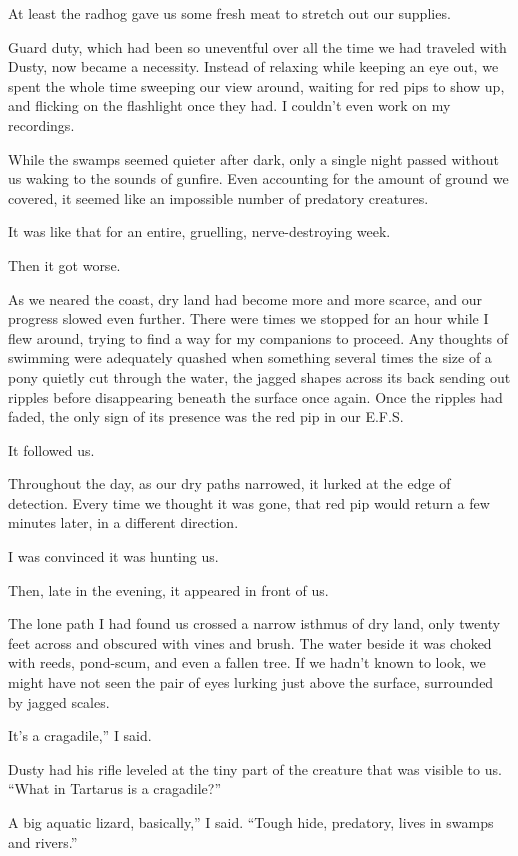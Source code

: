 At least the radhog gave us some fresh meat to stretch out our supplies.

Guard duty, which had been so uneventful over all the time we had traveled with Dusty, now became a necessity. Instead of relaxing while keeping an eye out, we spent the whole time sweeping our view around, waiting for red pips to show up, and flicking on the flashlight once they had. I couldn’t even work on my recordings.

While the swamps seemed quieter after dark, only a single night passed without us waking to the sounds of gunfire. Even accounting for the amount of ground we covered, it seemed like an impossible number of predatory creatures.

It was like that for an entire, gruelling, nerve-destroying week.

Then it got worse.

As we neared the coast, dry land had become more and more scarce, and our progress slowed even further. There were times we stopped for an hour while I flew around, trying to find a way for my companions to proceed. Any thoughts of swimming were adequately quashed when something several times the size of a pony quietly cut through the water, the jagged shapes across its back sending out ripples before disappearing beneath the surface once again. Once the ripples had faded, the only sign of its presence was the red pip in our E.F.S.

It followed us.

Throughout the day, as our dry paths narrowed, it lurked at the edge of detection. Every time we thought it was gone, that red pip would return a few minutes later, in a different direction.

I was convinced it was hunting us.

Then, late in the evening, it appeared in front of us.

The lone path I had found us crossed a narrow isthmus of dry land, only twenty feet across and obscured with vines and brush. The water beside it was choked with reeds, pond-scum, and even a fallen tree. If we hadn’t known to look, we might have not seen the pair of eyes lurking just above the surface, surrounded by jagged scales.

\leavevmode{}It’s a cragadile,” I said.

Dusty had his rifle leveled at the tiny part of the creature that was visible to us. “What in Tartarus is a cragadile?”

\leavevmode{}A big aquatic lizard, basically,” I said. “Tough hide, predatory, lives in swamps and rivers.”

